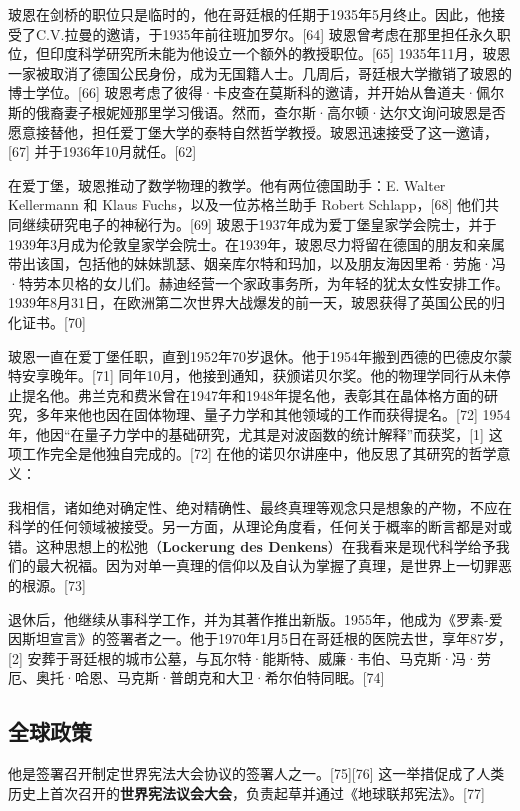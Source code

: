 玻恩在剑桥的职位只是临时的，他在哥廷根的任期于1935年5月终止。因此，他接受了C.V.拉曼的邀请，于1935年前往班加罗尔。[64] 玻恩曾考虑在那里担任永久职位，但印度科学研究所未能为他设立一个额外的教授职位。[65] 1935年11月，玻恩一家被取消了德国公民身份，成为无国籍人士。几周后，哥廷根大学撤销了玻恩的博士学位。[66] 玻恩考虑了彼得·卡皮查在莫斯科的邀请，并开始从鲁道夫·佩尔斯的俄裔妻子根妮娅那里学习俄语。然而，查尔斯·高尔顿·达尔文询问玻恩是否愿意接替他，担任爱丁堡大学的泰特自然哲学教授。玻恩迅速接受了这一邀请，[67] 并于1936年10月就任。[62]

在爱丁堡，玻恩推动了数学物理的教学。他有两位德国助手：E. Walter Kellermann 和 Klaus Fuchs，以及一位苏格兰助手 Robert Schlapp，[68] 他们共同继续研究电子的神秘行为。[69] 玻恩于1937年成为爱丁堡皇家学会院士，并于1939年3月成为伦敦皇家学会院士。在1939年，玻恩尽力将留在德国的朋友和亲属带出该国，包括他的妹妹凯瑟、姻亲库尔特和玛加，以及朋友海因里希·劳施·冯·特劳本贝格的女儿们。赫迪经营一个家政事务所，为年轻的犹太女性安排工作。1939年8月31日，在欧洲第二次世界大战爆发的前一天，玻恩获得了英国公民的归化证书。[70]

玻恩一直在爱丁堡任职，直到1952年70岁退休。他于1954年搬到西德的巴德皮尔蒙特安享晚年。[71] 同年10月，他接到通知，获颁诺贝尔奖。他的物理学同行从未停止提名他。弗兰克和费米曾在1947年和1948年提名他，表彰其在晶体格方面的研究，多年来他也因在固体物理、量子力学和其他领域的工作而获得提名。[72] 1954年，他因“在量子力学中的基础研究，尤其是对波函数的统计解释”而获奖，[1] 这项工作完全是他独自完成的。[72] 在他的诺贝尔讲座中，他反思了其研究的哲学意义：  

我相信，诸如绝对确定性、绝对精确性、最终真理等观念只是想象的产物，不应在科学的任何领域被接受。另一方面，从理论角度看，任何关于概率的断言都是对或错。这种思想上的松弛（\textbf{Lockerung des Denkens}）在我看来是现代科学给予我们的最大祝福。因为对单一真理的信仰以及自认为掌握了真理，是世界上一切罪恶的根源。[73]

退休后，他继续从事科学工作，并为其著作推出新版。1955年，他成为《罗素-爱因斯坦宣言》的签署者之一。他于1970年1月5日在哥廷根的医院去世，享年87岁，[2] 安葬于哥廷根的城市公墓，与瓦尔特·能斯特、威廉·韦伯、马克斯·冯·劳厄、奥托·哈恩、马克斯·普朗克和大卫·希尔伯特同眠。[74]
\subsection{全球政策}  
他是签署召开制定世界宪法大会协议的签署人之一。[75][76] 这一举措促成了人类历史上首次召开的\textbf{世界宪法议会大会}，负责起草并通过《地球联邦宪法》。[77]
